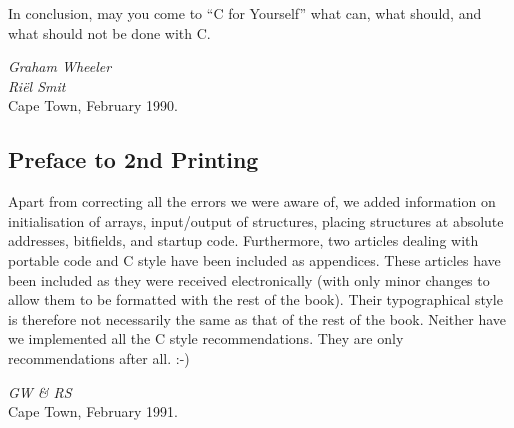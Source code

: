 In conclusion, may you come to ``C for Yourself'' what can, what should, and
what should not be done with C.

\bigskip\noindent
{\em Graham Wheeler\\
Ri\"{e}l Smit}\\
Cape Town, February 1990.

\subsection*{Preface to 2nd Printing}

Apart from correcting all the errors we were aware of, we added
information on initialisation of arrays, 
input/output of structures, placing structures at absolute addresses,
bitfields, and startup code.  Furthermore, two
articles dealing with portable code and C style have been included as
appendices.  These articles have been included as they
were received electronically
(with only minor changes to
allow them to be formatted with the rest of the book).
Their typographical style is therefore not
necessarily the same as that of the rest of the book.  Neither have we
implemented all the  C style recommendations. They are only 
recommendations after all. {\cd :-)}

\bigskip\noindent
{\em GW \& RS}\\
Cape Town, February 1991.

